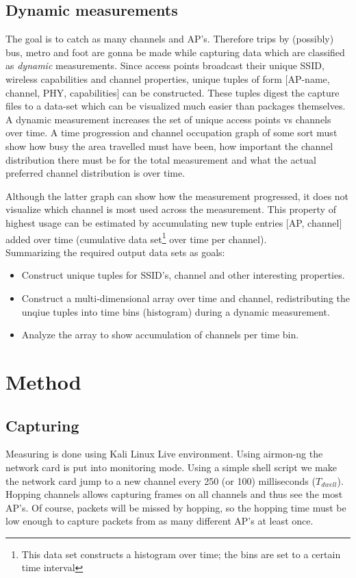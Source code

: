 \documentclass[11pt,a4paper]{article}
\begin{document}
\subsection{Dynamic measurements}
The goal is to catch as many channels and AP's. Therefore trips by (possibly) bus, metro and foot are gonna be made while capturing data which are classified as \emph{dynamic} measurements. Since access points broadcast their unique SSID, wireless capabilities and channel properties, unique tuples of form [AP-name, channel, PHY, capabilities] can be constructed. These tuples digest the capture files to a data-set which can be visualized much easier than packages themselves. \\
A dynamic measurement increases the set of unique access points vs channels over time. A time progression and channel occupation graph of some sort must show how busy the area travelled must have been, how important the channel distribution there must be for the total measurement and what the actual preferred channel distribution is over time.

Although the latter graph can show how the measurement progressed, it does not visualize which channel is most used across the measurement. This property of highest usage can be estimated by accumulating new tuple entries [AP, channel] added over time (cumulative data set\footnote{This data set constructs a histogram over time; the bins are set to a certain time interval} over time per channel). \\

Summarizing the required output data sets as goals: 
\begin{itemize}
    \item Construct unique tuples for SSID's, channel and other interesting properties.
    \item Construct a multi-dimensional array over time and channel, redistributing the unqiue tuples into time bins (histogram) during a dynamic measurement.
    \item Analyze the array to show accumulation of channels per time bin.
\end{itemize}

\section{Method}
\subsection{Capturing}
Measuring is done using Kali Linux Live environment. Using airmon-ng the network card is put into monitoring mode. 
Using a simple shell script we make the network card jump to a new channel every 250 (or 100) milliseconds ($T_{dwell}$). Hopping channels allows capturing frames on all channels and thus see the most AP's. Of course, packets will be missed by hopping, so the hopping time must be low enough to capture packets from as many different AP's at least once. 
\end{document}
